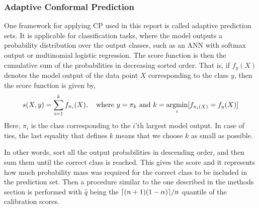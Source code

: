 \subsubsection{Adaptive Conformal Prediction}
%
One framework for applying CP used in this report is called adaptive prediction sets. It is applicable for classification tasks, where the model outputs a probability distribution over the output classes, such as an ANN with softmax output or multinomial logistic regression.
The score function is then the cumulative sum of the probabilities in decreasing sorted order. That is, if $f_y(X)$ denotes the model output of the data point $X$ corresponding to the class $y$, then the score function is given by,
%
\begin{gather}
    s(X,y)=\sum_{i = 1}^k f_{\pi_i}(X), \quad \text{where $y = \pi_k$ and }k = \operatorname*{\text{argmin}}_{i} [f_{\pi_i(X)} = f_y(X)]
\end{gather}
Here, $\pi_i$ is the class corresponding to the $i$'th largest model output. In case of ties, the last equality that defines $k$ means that we choose $k$ as small as possible.
%
%

In other words, sort all the output probabilities in descending order, and then sum them until the correct class is reached. This gives the score
and it represents how much probability mass was required for the correct class to be included in the prediction set.
%
Then a procedure similar to the one described in the methods section is performed with $\hat q$ being the $\lceil {(n+1)(1-\alpha)} \rceil/n$ quantile of the calibration scores.

